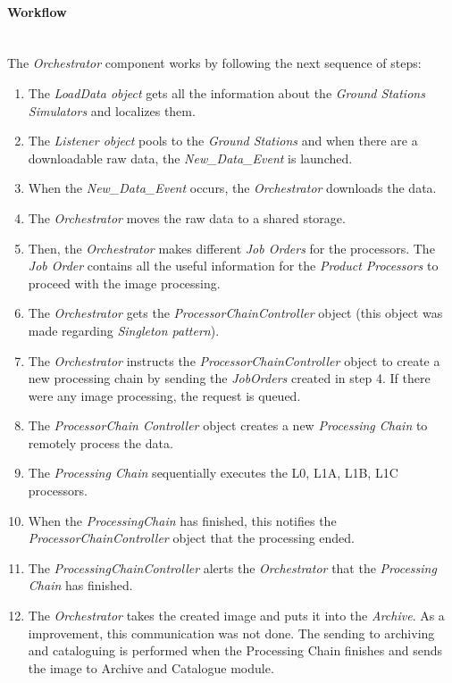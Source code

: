 \paragraph{Workflow}~\\

The \emph{Orchestrator} component works by following the next sequence of steps:
\begin{enumerate}
\item The \emph{LoadData object} gets all the information about the \emph{Ground
    Stations Simulators} and localizes them.
\item The \emph{Listener object} pools to the \emph{Ground Stations} and when there are
  a downloadable raw data, the \emph{New\_Data\_Event} is launched.
\item  When the \emph{New\_Data\_Event} occurs, the \emph{Orchestrator} downloads the data.
\item  The \emph{Orchestrator} moves the raw data to a shared storage.
\item Then, the \emph{Orchestrator} makes different \emph{Job Orders} for the processors. The \emph{Job Order} contains all the useful information for the \emph{Product Processors} to proceed with the image processing.
\item The \emph{Orchestrator} gets the \emph{ProcessorChainController} object (this object was made regarding \emph{Singleton pattern}).
\item The \emph{Orchestrator} instructs the \emph{ProcessorChainController}
  object to create a new processing chain by sending the \emph{JobOrders}
  created in step 4. If there were any image processing, the request is queued.
\item The \emph{ProcessorChain Controller} object creates a new \emph{Processing
  Chain} to remotely process the data.
\item The \emph{Processing Chain} sequentially executes the L0, L1A, L1B, L1C processors.
\item When the \emph{ProcessingChain} has finished, this notifies the \emph{ProcessorChainController} object that the processing ended.
\item The \emph{ProcessingChainController} alerts the \emph{Orchestrator} that the \emph{Processing Chain} has finished.
\item The \emph{Orchestrator} takes the created image and puts it into the
  \emph{Archive}. As a improvement, this communication was not done. The
  sending to archiving and cataloguing is performed when the Processing Chain
  finishes and sends the image to Archive and Catalogue module. 
\end{enumerate}

